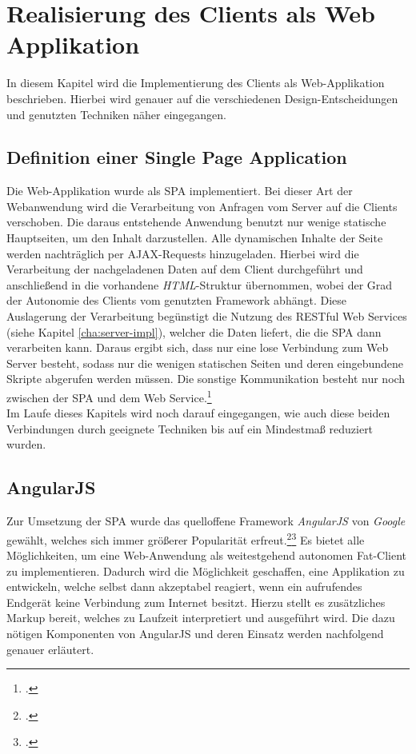 \chapter{Realisierung des Clients als Web Applikation}
\label{cha:web-app}
In diesem Kapitel wird die Implementierung des Clients als Web-Applikation beschrieben. Hierbei wird genauer auf die verschiedenen Design-Entscheidungen und genutzten Techniken näher eingegangen. 
\section{Definition einer Single Page Application}
\label{sec:Definition-SPA}
Die Web-Applikation wurde als \ac{SPA} implementiert. Bei dieser Art der Webanwendung wird die Verarbeitung von Anfragen vom Server auf die Clients verschoben. Die daraus entstehende Anwendung benutzt nur wenige statische Hauptseiten, um den Inhalt darzustellen. Alle dynamischen Inhalte der Seite werden nachträglich per \ac{AJAX}-Requests hinzugeladen.  Hierbei wird die Verarbeitung der nachgeladenen Daten auf dem Client durchgeführt und anschließend in die vorhandene \textit{\ac{HTML}}-Struktur übernommen, wobei der Grad der Autonomie des Clients vom genutzten Framework abhängt. Diese Auslagerung der Verarbeitung begünstigt die Nutzung des \ac{REST}ful Web Services (siehe Kapitel \ref{cha:server-impl}), welcher die Daten liefert, die die \ac{SPA} dann verarbeiten kann. Daraus ergibt sich, dass nur eine lose Verbindung zum Web Server besteht, sodass nur die wenigen statischen Seiten und deren eingebundene Skripte abgerufen werden müssen. Die sonstige Kommunikation besteht nur noch zwischen der \ac{SPA} und dem Web Service.\footcite[S. 31f.]{book:AngularJs:Steyer2015} \\
Im Laufe dieses Kapitels wird noch darauf eingegangen, wie auch diese beiden Verbindungen durch geeignete Techniken bis auf ein Mindestmaß reduziert wurden.
\section{AngularJS}
\label{sec:AngularJS}
Zur Umsetzung der \ac{SPA} wurde das quelloffene Framework \textit{AngularJS} von \textit{Google} gewählt, welches sich immer größerer Popularität erfreut.\footcite{online:angularjs-popularity}\footcite[S. 33]{book:AngularJs:Steyer2015} Es bietet alle Möglichkeiten, um eine Web-Anwendung als weitestgehend autonomen \gls{Fat-Client} zu implementieren. Dadurch wird die Möglichkeit geschaffen, eine Applikation zu entwickeln, welche selbst dann akzeptabel reagiert, wenn ein aufrufendes Endgerät keine Verbindung zum Internet besitzt. Hierzu stellt es zusätzliches \gls{Markup} bereit, welches zu Laufzeit interpretiert und ausgeführt wird. Die dazu nötigen Komponenten von AngularJS und deren Einsatz werden nachfolgend genauer erläutert.

